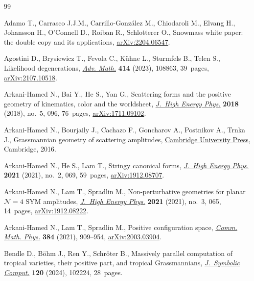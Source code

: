 \documentclass[pdftex]{sigma}
\theoremstyle{definition}
\numberwithin{equation}{section}
\begin{document}
\begin{thebibliography}{99}
\footnotesize\itemsep=0pt

Adamo T., Carrasco J.J.M., Carrillo-Gonz\'alez M., Chiodaroli M., Elvang H.,
 Johansson H., O'Connell D., Roiban R., Schlotterer O., Snowmass white paper:
 the double copy and its applications, \href{https://arxiv.org/abs/2204.06547}{arXiv:2204.06547}.

Agostini D., Brysiewicz T., Fevola C., K\"uhne L., Sturmfels B., Telen S.,
 Likelihood degenerations, \href{https://doi.org/10.1016/j.aim.2023.108863}{\textit{Adv. Math.}} \textbf{414} (2023), 108863,
 39~pages, \href{https://arxiv.org/abs/2107.10518}{arXiv:2107.10518}.

Arkani-Hamed N., Bai Y., He S., Yan G., Scattering forms and the positive
 geometry of kinematics, color and the worldsheet, \href{https://doi.org/10.1007/jhep05(2018)096}{\textit{J.~High Energy
 Phys.}} \textbf{2018} (2018), no.~5, 096, 76~pages, \href{https://arxiv.org/abs/1711.09102}{arXiv:1711.09102}.

Arkani-Hamed N., Bourjaily J., Cachazo F., Goncharov A., Postnikov A., Trnka
 J., Grassmannian geometry of scattering amplitudes, \href{https://doi.org/10.1017/CBO9781316091548}{Cambridge University
 Press}, Cambridge, 2016.

Arkani-Hamed N., He S., Lam T., Stringy canonical forms, \href{https://doi.org/10.1007/jhep02(2021)069}{\textit{J.~High Energy
 Phys.}} \textbf{2021} (2021), no.~2, 069, 59~pages, \href{https://arxiv.org/abs/1912.08707}{arXiv:1912.08707}.

Arkani-Hamed N., Lam T., Spradlin M., Non-perturbative geometries for planar
 {$\mathcal N = 4$} {SYM} amplitudes, \href{https://doi.org/10.1007/jhep03(2021)065}{\textit{J.~High Energy Phys.}}
 \textbf{2021} (2021), no.~3, 065, 14~pages, \href{https://arxiv.org/abs/1912.08222}{arXiv:1912.08222}.

Arkani-Hamed N., Lam T., Spradlin M., Positive configuration space,
 \href{https://doi.org/10.1007/s00220-021-04041-x}{\textit{Comm. Math. Phys.}} \textbf{384} (2021), 909--954,
 \href{https://arxiv.org/abs/2003.03904}{arXiv:2003.03904}.

Bendle D., B\"{o}hm J., Ren Y., Schr\"oter B., Massively parallel computation
 of tropical varieties, their positive part, and tropical {G}rassmannians,
 \href{https://doi.org/10.1016/j.jsc.2023.102224}{\textit{J.~Symbolic Comput.}} \textbf{120} (2024), 102224, 28~pages.


\end{thebibliography}
\end{document}

